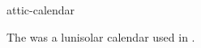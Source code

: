\documentclass{stex}
\begin{document}
\begin{smodule}{attic-calendar}
\begin{sparagraph}[style=symdoc]
The  was a lunisolar calendar used in .
\end{sparagraph}
\end{smodule}
\end{document}
